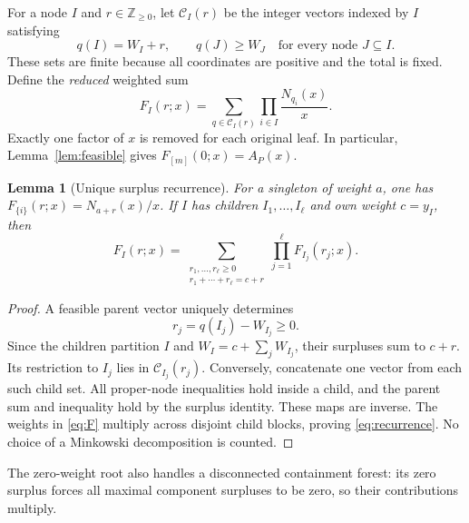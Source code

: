 \documentclass[11pt,letterpaper]{article}
\newtheorem{lemma}[theorem]{Lemma}
\theoremstyle{definition}
\theoremstyle{remark}
\newcommand{\NN}{\mathbb{Z}_{\geq 0}}
\begin{document}
For a node $I$ and $r\in\NN$, let $\mathcal C_I(r)$ be the integer vectors indexed by $I$ satisfying
\[
 q(I)=W_I+r,\qquad q(J)\geq W_J
       \quad\text{for every node }J\subseteq I.
\]
These sets are finite because all coordinates are positive and the total is fixed. Define the \emph{reduced} weighted sum
\begin{equation}\label{eq:F}
 F_I(r;x)=\sum_{q\in\mathcal C_I(r)}\prod_{i\in I}\frac{N_{q_i}(x)}{x}.
\end{equation}
Exactly one factor of $x$ is removed for each original leaf. In particular, Lemma~\ref{lem:feasible} gives $F_{[m]}(0;x)=A_P(x)$.

\begin{lemma}[Unique surplus recurrence]\label{lem:recurrence}
For a singleton of weight $a$, one has $F_{\{i\}}(r;x)=N_{a+r}(x)/x$. If $I$ has children $I_1,\ldots,I_\ell$ and own weight $c=y_I$, then
\begin{equation}\label{eq:recurrence}
 F_I(r;x)=\sum_{\substack{r_1,\ldots,r_\ell\geq0\\r_1+\cdots+r_\ell=c+r}}
                 \prod_{j=1}^\ell F_{I_j}(r_j;x).
\end{equation}
\end{lemma}
\begin{proof}
A feasible parent vector uniquely determines
\[
 r_j=q(I_j)-W_{I_j}\geq0.
\]
Since the children partition $I$ and $W_I=c+\sum_jW_{I_j}$, their surpluses sum to $c+r$. Its restriction to $I_j$ lies in $\mathcal C_{I_j}(r_j)$. Conversely, concatenate one vector from each such child set. All proper-node inequalities hold inside a child, and the parent sum and inequality hold by the surplus identity. These maps are inverse. The weights in \eqref{eq:F} multiply across disjoint child blocks, proving \eqref{eq:recurrence}. No choice of a Minkowski decomposition is counted.
\end{proof}

The zero-weight root also handles a disconnected containment forest: its zero surplus forces all maximal component surpluses to be zero, so their contributions multiply.
\end{document}
